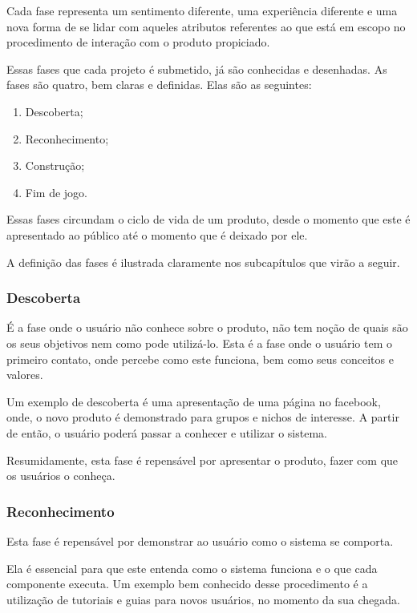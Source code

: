 Cada fase representa um sentimento diferente, uma experiência diferente
e uma nova forma de se lidar com aqueles atributos referentes ao que está
em escopo no procedimento de interação com o produto propiciado.

Essas fases que cada projeto é submetido, já são conhecidas e desenhadas. As fases
são quatro, bem claras e definidas. Elas são as seguintes:

\begin{enumerate}
    \item Descoberta;
    \item Reconhecimento;
    \item Construção;
    \item Fim de jogo.
\end{enumerate}

Essas fases circundam o ciclo de vida de um produto, desde o momento que este
é apresentado ao público até o momento que é deixado por ele.

A definição das fases é ilustrada claramente nos subcapítulos que virão a seguir.

\subsubsection{Descoberta}
\label{sub:descoperta}
É a fase onde o usuário não conhece sobre o produto, não tem noção de quais são
os
seus objetivos nem como pode utilizá-lo. Esta é a fase onde o usuário tem o primeiro
contato, onde percebe como este funciona, bem como seus conceitos e valores.

Um exemplo de descoberta é uma apresentação de uma página no facebook, onde,
o novo produto é demonstrado para grupos e nichos de interesse. A partir
de então, o usuário poderá passar a conhecer e utilizar o sistema.

Resumidamente, esta fase é repensável por apresentar o produto, fazer
com que os usuários o conheça.

\subsubsection{Reconhecimento}
\label{sub:reconhecimento}
Esta fase é repensável por demonstrar ao usuário como o sistema se comporta.

Ela é essencial para que este entenda como o sistema funciona e o que cada
componente executa. Um exemplo bem conhecido desse procedimento é a utilização
de tutoriais e guias para novos usuários, no momento da sua chegada.

